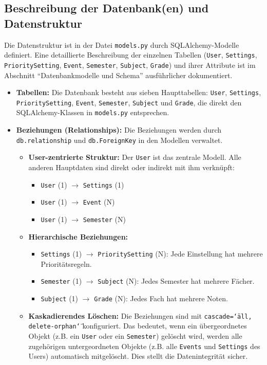 \documentclass[12pt,a4paper]{report}
\begin{document}
\subsection{Beschreibung der Datenbank(en) und Datenstruktur}
Die Datenstruktur ist in der Datei \texttt{models.py} durch SQLAlchemy-Modelle definiert. Eine detaillierte Beschreibung der einzelnen Tabellen (\texttt{User}, \texttt{Settings}, \texttt{PrioritySetting}, \texttt{Event}, \texttt{Semester}, \texttt{Subject}, \texttt{Grade}) und ihrer Attribute ist im Abschnitt \enquote{Datenbankmodelle und Schema} ausführlicher dokumentiert.

\begin{itemize}
    \item \textbf{Tabellen:}
    Die Datenbank besteht aus sieben Haupttabellen: \texttt{User}, \texttt{Settings}, \texttt{PrioritySetting}, \texttt{Event}, \texttt{Semester}, \texttt{Subject} und \texttt{Grade}, die direkt den SQLAlchemy-Klassen in \texttt{models.py} entsprechen.

    \item \textbf{Beziehungen (Relationships):}
    Die Beziehungen werden durch \texttt{db.relationship} und \texttt{db.ForeignKey} in den Modellen verwaltet.
    \begin{itemize}
        \item \textbf{User-zentrierte Struktur:} Der \texttt{User} ist das zentrale Modell. Alle anderen Hauptdaten sind direkt oder indirekt mit ihm verknüpft:
        \begin{itemize}
            \item \texttt{User} (1) $\to$ \texttt{Settings} (1)
            \item \texttt{User} (1) $\to$ \texttt{Event} (N)
            \item \texttt{User} (1) $\to$ \texttt{Semester} (N)
        \end{itemize}
        \item \textbf{Hierarchische Beziehungen:}
        \begin{itemize}
            \item \texttt{Settings} (1) $\to$ \texttt{PrioritySetting} (N): Jede Einstellung hat mehrere Prioritätsregeln.
            \item \texttt{Semester} (1) $\to$ \texttt{Subject} (N): Jedes Semester hat mehrere Fächer.
            \item \texttt{Subject} (1) $\to$ \texttt{Grade} (N): Jedes Fach hat mehrere Noten.
        \end{itemize}
        \item \textbf{Kaskadierendes Löschen:} Die Beziehungen sind mit \texttt{cascade=\char`\"all, delete-orphan\char`\"} konfiguriert. Das bedeutet, wenn ein übergeordnetes Objekt (z.B. ein \texttt{User} oder ein \texttt{Semester}) gelöscht wird, werden alle zugehörigen untergeordneten Objekte (z.B. alle \texttt{Events} und \texttt{Settings} des Users) automatisch mitgelöscht. Dies stellt die Datenintegrität sicher.
    \end{itemize}
\end{itemize}
\end{document}
